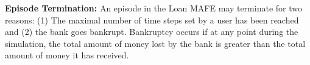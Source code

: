 \textbf{Episode Termination:} An episode in the Loan MAFE may terminate for two reasons: (1) The maximal number of time steps set by a user has been reached and (2) the bank goes bankrupt. Bankruptcy occurs if at any point during the simulation, the total amount of money lost by the bank is greater than the total amount of money it has received.
